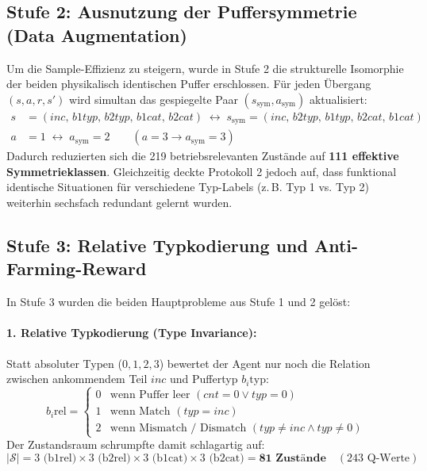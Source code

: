 \documentclass[11pt,a4paper]{article}
\begin{document}
\subsection{Stufe 2: Ausnutzung der Puffersymmetrie (Data Augmentation)}
Um die Sample-Effizienz zu steigern, wurde in Stufe 2 die strukturelle Isomorphie der beiden physikalisch identischen Puffer erschlossen. Für jeden Übergang $(s, a, r, s')$ wird simultan das gespiegelte Paar $(s_{\text{sym}}, a_{\text{sym}})$ aktualisiert:
\begin{align}
  s &= (inc,\, b1typ,\, b2typ,\, b1cat,\, b2cat) \;\longleftrightarrow\; s_{\text{sym}} = (inc,\, b2typ,\, b1typ,\, b2cat,\, b1cat) \\
  a &= 1 \;\longleftrightarrow\; a_{\text{sym}} = 2 \qquad (a=3 \to a_{\text{sym}}=3)
\end{align}
Dadurch reduzierten sich die 219 betriebsrelevanten Zustände auf \textbf{111 effektive Symmetrieklassen}. Gleichzeitig deckte Protokoll 2 jedoch auf, dass funktional identische Situationen für verschiedene Typ-Labels (z.\,B. Typ 1 vs. Typ 2) weiterhin sechsfach redundant gelernt wurden.

\subsection{Stufe 3: Relative Typkodierung und Anti-Farming-Reward}
In Stufe 3 wurden die beiden Hauptprobleme aus Stufe 1 und 2 gelöst:

\paragraph{1. Relative Typkodierung (Type Invariance):}
Statt absoluter Typen ($0, 1, 2, 3$) bewertet der Agent nur noch die Relation zwischen ankommendem Teil $inc$ und Puffertyp $b_i\text{typ}$:
\begin{equation}
  b_i\text{rel} = \begin{cases}
    0 & \text{wenn Puffer leer } (cnt=0 \vee typ=0) \\
    1 & \text{wenn Match } (typ = inc) \\
    2 & \text{wenn Mismatch / Dismatch } (typ \neq inc \wedge typ \neq 0)
  \end{cases}
\end{equation}
Der Zustandsraum schrumpfte damit schlagartig auf:
\[
  |\mathcal{S}| = 3 \text{ (b1rel)} \times 3 \text{ (b2rel)} \times 3 \text{ (b1cat)} \times 3 \text{ (b2cat)} = \mathbf{81 \text{ Zustände}} \quad (243 \text{ Q-Werte})
\]
\end{document}
